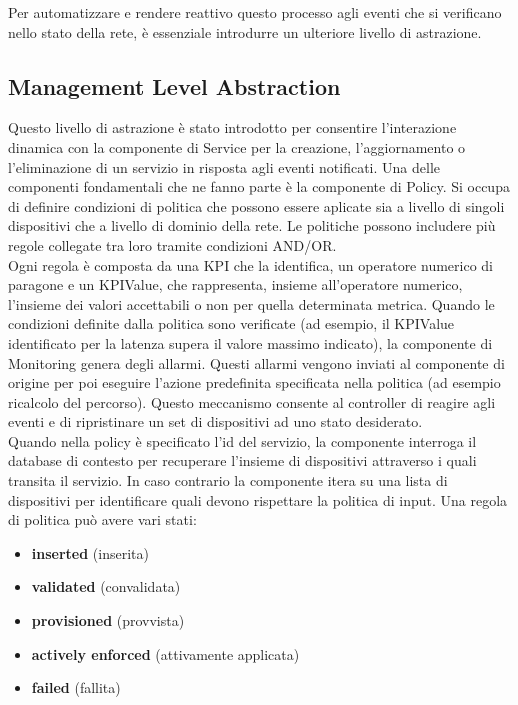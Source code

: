 Per automatizzare e rendere reattivo questo processo agli eventi che si verificano nello stato della rete, è essenziale introdurre un ulteriore livello di astrazione.

\subsection{Management Level Abstraction}
Questo livello di astrazione è stato introdotto per consentire l'interazione dinamica con la componente di Service per la creazione, l'aggiornamento o l'eliminazione di un servizio in risposta agli eventi notificati.
Una delle componenti fondamentali che ne fanno parte è la componente di Policy.
Si occupa di definire condizioni di politica che possono essere aplicate sia a livello di singoli dispositivi che a livello di dominio della rete.
Le politiche possono includere più regole collegate tra loro tramite condizioni AND/OR.
\\Ogni regola è composta da una KPI che la identifica, un operatore numerico di paragone e un KPIValue, che rappresenta, insieme all'operatore numerico, l'insieme dei valori accettabili o non per quella determinata metrica.
Quando le condizioni definite dalla politica sono verificate (ad esempio, il KPIValue identificato per la latenza supera il valore massimo indicato), la componente di Monitoring
genera degli allarmi. Questi allarmi vengono inviati al componente di origine per poi eseguire l'azione predefinita specificata nella politica (ad esempio ricalcolo del percorso).
Questo meccanismo consente al controller di reagire agli eventi e di ripristinare un set di dispositivi ad uno stato desiderato.
\\Quando nella policy è specificato l'id del servizio, la componente interroga il database di contesto per recuperare l'insieme di dispositivi attraverso i quali transita il servizio.
In caso contrario la componente itera su una lista di dispositivi per identificare quali devono rispettare la politica di input.
Una regola di politica può avere vari stati:
\begin{itemize}
    \item \textbf{inserted} (inserita)
    \item \textbf{validated} (convalidata)
    \item \textbf{provisioned} (provvista)
    \item \textbf{actively enforced} (attivamente applicata)
    \item \textbf{failed} (fallita)
\end{itemize}
